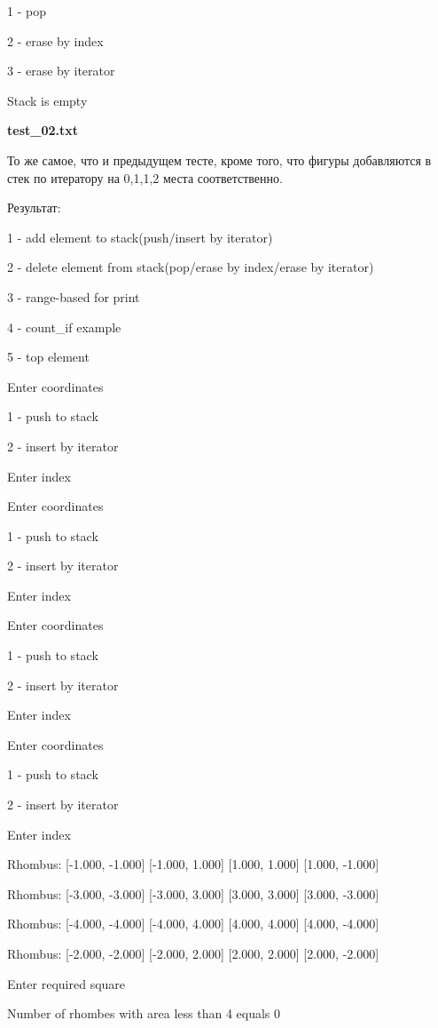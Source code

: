 \documentclass[a4paper, 12pt]{article}
\begin{document}
1 - pop

2 - erase by index

3 - erase by iterator

Stack is empty






\vspace{3ex}

\textbf{test\_02.txt} 

То же самое, что и предыдущем тесте, кроме того, что фигуры добавляются в стек по итератору на 0,1,1,2 места соответственно.

Результат:

1 - add element to stack(push/insert by iterator)

2 - delete element from stack(pop/erase by index/erase by iterator)

3 - range-based for print

4 - count\_if example

5 - top element

Enter coordinates

1 - push to stack

2 - insert by iterator

Enter index

Enter coordinates

1 - push to stack


2 - insert by iterator

Enter index

Enter coordinates

1 - push to stack

2 - insert by iterator

Enter index


Enter coordinates

1 - push to stack

2 - insert by iterator

Enter index

Rhombus: [-1.000, -1.000] [-1.000, 1.000] [1.000, 1.000] [1.000, -1.000] 

Rhombus: [-3.000, -3.000] [-3.000, 3.000] [3.000, 3.000] [3.000, -3.000] 

Rhombus: [-4.000, -4.000] [-4.000, 4.000] [4.000, 4.000] [4.000, -4.000] 

Rhombus: [-2.000, -2.000] [-2.000, 2.000] [2.000, 2.000] [2.000, -2.000] 

Enter required square

Number of rhombes with area less than 4 equals 0
\end{document}
